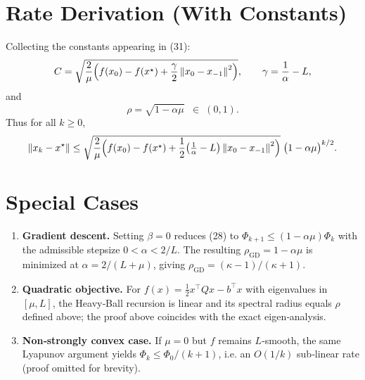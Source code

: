 \documentclass{article}
\newcommand{\norm}[1]{\left\lVert#1\right\rVert}
\begin{document}
\section*{Rate Derivation (With Constants)}
Collecting the constants appearing in (31):
\[
C = \sqrt{\frac{2}{\mu}\Bigl(f(x_0)-f(x^\star)+\frac{\gamma}{2}\norm{x_0-x_{-1}}^{2}\Bigr)},
\qquad
\gamma = \frac{1}{\alpha}-L,
\]
and
\[
\rho = \sqrt{1-\alpha\mu}\;\; \in\;(0,1).
\]
Thus for all $k\ge0$,
\[
\norm{x_k-x^\star}\le
\sqrt{\frac{2}{\mu}\Bigl(f(x_0)-f(x^\star)+\frac{1}{2}\bigl(\tfrac1\alpha-L\bigr)\norm{x_0-x_{-1}}^{2}\Bigr)}\;
\bigl(1-\alpha\mu\bigr)^{k/2}.
\]

\section*{Special Cases}
\begin{enumerate}[label=\alph*)]
\item \textbf{Gradient descent.} Setting $\beta=0$ reduces (28) to $\Phi_{k+1}\le (1-\alpha\mu)\Phi_k$ with the admissible stepsize $0<\alpha<2/L$. The resulting $\rho_{\text{GD}}=1-\alpha\mu$ is minimized at $\alpha=2/(L+\mu)$, giving $\rho_{\text{GD}}=(\kappa-1)/(\kappa+1)$.
\item \textbf{Quadratic objective.} For $f(x)=\tfrac12 x^{\top}Qx-b^{\top}x$ with eigenvalues in $[\mu,L]$, the Heavy‑Ball recursion is linear and its spectral radius equals $\rho$ defined above; the proof above coincides with the exact eigen‑analysis.
\item \textbf{Non‑strongly convex case.} If $\mu=0$ but $f$ remains $L$‑smooth, the same Lyapunov argument yields $\Phi_k\le \Phi_0/(k+1)$, i.e. an $O(1/k)$ sub‑linear rate (proof omitted for brevity).
\end{enumerate}
\end{document}
